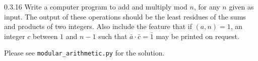\begin{exercise}{0.3.16}
    Write a computer program to add and multiply mod $n$, for any $n$ given as input.
	The output of these operations should be the least residues of the sums and products of two integers.
	Also include the feature that if $(a, n) = 1$, an integer $c$ between $1$ and $n - 1$ such that $\bar a \cdot \bar c = \bar 1$ may be printed on request. 
    
\end{exercise}

\begin{sol}
    Please see \verb|modular_arithmetic.py| for the solution.
\end{sol}